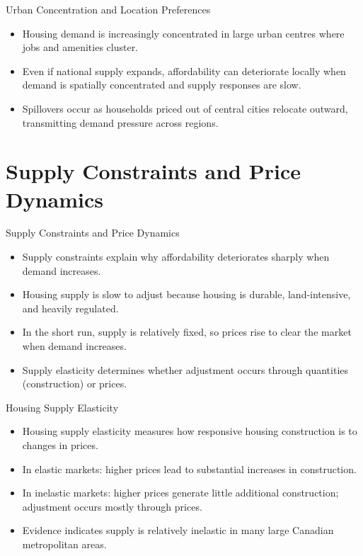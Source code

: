 \documentclass[aspectratio=169]{beamer}
\begin{document}
\begin{frame}{Urban Concentration and Location Preferences}
\transfade
\begin{itemize}
  \item Housing demand is increasingly concentrated in large urban centres where jobs and amenities cluster.
  \item Even if national supply expands, affordability can deteriorate locally when demand is spatially concentrated and supply responses are slow.
  \item Spillovers occur as households priced out of central cities relocate outward, transmitting demand pressure across regions.
\end{itemize}
\end{frame}

\section{Supply Constraints and Price Dynamics}

\begin{frame}{Supply Constraints and Price Dynamics}
\transfade
\begin{itemize}
  \item Supply constraints explain why affordability deteriorates sharply when demand increases.
  \item Housing supply is slow to adjust because housing is durable, land-intensive, and heavily regulated.
  \item In the short run, supply is relatively fixed, so prices rise to clear the market when demand increases.
  \item Supply elasticity determines whether adjustment occurs through quantities (construction) or prices.
\end{itemize}
\end{frame}

\begin{frame}{Housing Supply Elasticity}
\transfade
\begin{itemize}
  \item Housing supply elasticity measures how responsive housing construction is to changes in prices.
  \item In elastic markets: higher prices lead to substantial increases in construction.
  \item In inelastic markets: higher prices generate little additional construction; adjustment occurs mostly through prices.
  \item Evidence indicates supply is relatively inelastic in many large Canadian metropolitan areas.
\end{itemize}
\end{frame}
\end{document}
